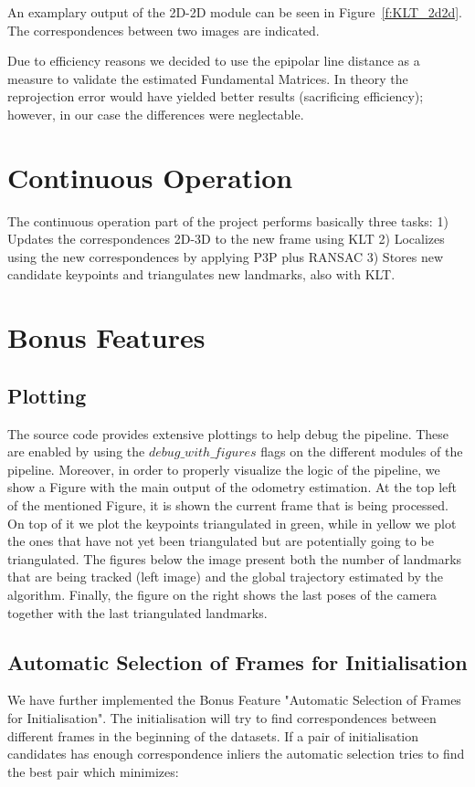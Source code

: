 An examplary output of the 2D-2D module can be seen in Figure~\ref{f:KLT_2d2d}. The correspondences between two images are indicated.

Due to efficiency reasons we decided to use the epipolar line distance as a measure to validate the estimated Fundamental Matrices. In theory the reprojection error would have yielded better results (sacrificing efficiency); however, in our case the differences were neglectable.

\section{Continuous Operation}
\label{s:ContOp}
The continuous operation part of the project performs basically three tasks:
1) Updates the correspondences 2D-3D to the new frame using KLT
2) Localizes using the new correspondences by applying P3P plus RANSAC
3) Stores new candidate keypoints and triangulates new landmarks, also with KLT.


\section{Bonus Features}
\label{s:BF}

\subsection{Plotting}
The source code provides extensive plottings to help debug the pipeline. These are enabled by using the $debug\_with\_figures$ flags
on the different modules of the pipeline. Moreover, in order to properly visualize the logic of the pipeline, we show a Figure 
with the main output of the odometry estimation.
At the top left of the mentioned Figure, it is shown the current frame that is being processed. On top of it we plot the keypoints
triangulated in green, while in yellow we plot the ones that have not yet been triangulated but are potentially going to be
triangulated.
The figures below the image present both the number of landmarks that are being tracked (left image) and the global trajectory
estimated by the algorithm.
Finally, the figure on the right shows the last poses of the camera together with the last triangulated landmarks.


\subsection{Automatic Selection of Frames for Initialisation}
We have further implemented the Bonus Feature "Automatic Selection of Frames for Initialisation". The initialisation will try to find correspondences between different frames in the beginning of the datasets. If a pair of initialisation candidates has enough correspondence inliers the automatic selection tries to find the best pair which minimizes:


